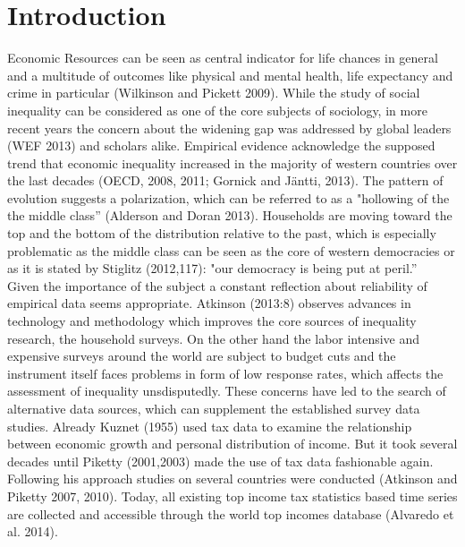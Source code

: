 
\section{Introduction}





Economic Resources can be seen as central indicator for life chances in general and a multitude of outcomes like physical and mental health, life expectancy and crime in particular (Wilkinson and Pickett 2009). While the study of social inequality can be considered as one of the core subjects of sociology, in more recent years the concern about the widening gap was addressed by global leaders (WEF 2013) and scholars alike. Empirical evidence acknowledge the supposed trend that economic inequality increased in the majority of western countries over the last decades (OECD, 2008, 2011; Gornick and Jäntti, 2013). The pattern of evolution suggests a polarization, which can be referred to as a "hollowing of the the middle class'' (Alderson and Doran 2013). Households are moving toward the top and the bottom of the distribution relative to the past, which is especially problematic as the middle class can be seen as the core of western democracies or as it is stated by Stiglitz (2012,117): "our democracy is being put at peril.''
\\




Given the importance of the subject a constant reflection about reliability of empirical data seems appropriate. Atkinson (2013:8) observes advances in technology and methodology which improves the core sources of inequality research, the household surveys.  On the other hand the labor intensive and expensive surveys around the world are subject to budget cuts and the instrument itself faces problems in form of low response rates, which affects the assessment of inequality unsdisputedly. These concerns have led to the search of alternative data sources, which can supplement the established survey data studies. Already Kuznet (1955) used tax data to examine the relationship between economic growth and personal distribution of income. But it took several decades until Piketty (2001,2003) made the use of tax data fashionable again. Following his approach studies on several countries were conducted (Atkinson and Piketty 2007, 2010). Today, all existing top income tax statistics based time series are collected and accessible through the world top incomes database (Alvaredo et al. 2014). \\

